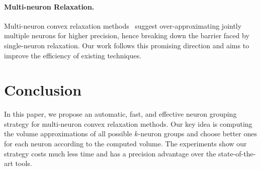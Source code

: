 \documentclass[runningheads]{llncs}
\begin{document}
\paragraph{Multi-neuron Relaxation.}
Multi-neuron convex relaxation
methods~\cite{DBLP:conf/nips/SinghGPV19,DBLP:conf/nips/TjandraatmadjaA20,DBLP:journals/pacmpl/MullerMSPV22}
suggest over-approximating jointly multiple neurons for higher
precision, hence breaking down the barrier faced by single-neuron
relaxation. Our work follows this promising direction and aims to
improve the efficiency of existing techniques.


%
%
%


\section{Conclusion}
\label{sec:conclusion}
In this paper, we propose an automatic, fast, and effective neuron grouping strategy for
multi-neuron convex relaxation methods.
Our key idea is computing the volume approximations of all possible $k$-neuron
groups and choose better ones for each neuron according to the computed volume.
The experiments show our strategy costs much less time and
has a precision advantage over the state-of-the-art tools.



%
%
%
\newpage




%
\end{document}
